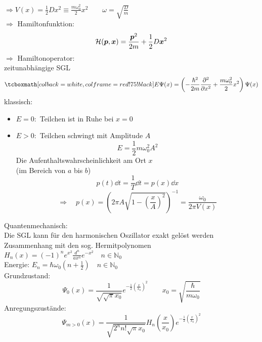 $ \Rightarrow V(x) = \frac{1}{2} D x^2 \equiv \frac{m \omega_0^2}{2} x^2 \qquad \omega = \sqrt{\frac{D}{m}} $\\
$ \Rightarrow $ Hamiltonfunktion:
$$ \mathcal{H}(\bm{p}, \bm{x}) = \frac{\bm{p}^2}{2m} + \frac{1}{2} D \bm{x}^2 $$
$ \Rightarrow $ Hamiltonoperator:\\
zeitunabhängige SGL
\begin{equation*}
\rmbox{ E \Psi(x) = \left(-\frac{\hbar^2}{2m} \prt{^2}{x^2} + \frac{m \omega_0^2}{2} x^2\right) \Psi(x) }
\end{equation*}
klassisch:
\begin{itemize}
	\item $ E = 0 : $ Teilchen ist in Ruhe bei $ x = 0 $
	\item $ E > 0 : $ Teilchen schwingt mit Amplitude $ A $
	\begin{equation*}
	E = \frac{1}{2} m \omega_0^2 A^2
	\end{equation*}
	Die Aufenthaltswahrscheinlichkeit am Ort $ x $\\
	(im Bereich von $ a $ bis $ b $)
	\begin{equation*}
	p(t) \dd t = \frac{1}{T} \dd t = p(x) \dd x
	\end{equation*}
	\begin{equation*}
	\Rightarrow \quad p(x) = \left(2 \pi A \sqrt{1 - \left(\frac{x}{A}\right)^2}\right)^{-1} = \frac{\omega_0}{2 \pi V(x)}
	\end{equation*}
\end{itemize}
Quantenmechanisch:\\[5pt]
Die SGL kann für den harmonischen Oszillator exakt gelöst werden\\
Zusammenhang mit den sog. Hermitpolynomen $ H_{n}(x) = (-1)^n e^{x^2} \frac{d^n}{a x^n} e^{-x^2} \quad n \in \mathbb{N}_0 $\\[5pt]
Energie: $ E_n = \hbar \omega_0 (n + \frac{1}{2}) \quad n \in \mathbb{N}_0 $\\
Grundzustand:
$$ \Psi_0(x) = \frac{1}{\sqrt{\sqrt{\pi} x_0}} e^{-\frac{1}{2} \left(\frac{x}{x_0}\right)^2} \qquad x_0 = \sqrt{\frac{\hbar}{m \omega_0}} $$
Anregungszustände:
\begin{equation*}
\Psi_{m > 0} (x) = \frac{1}{\sqrt{2^n n! \sqrt{\pi} x_0}} H_n \left(\frac{x}{x_0}\right) e^{-\frac{1}{2} \left(\frac{x}{x_0}\right)^2}
\end{equation*}
